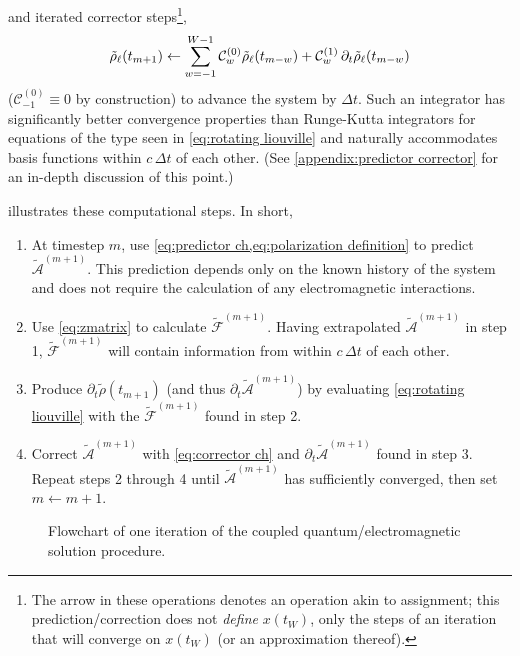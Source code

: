 and iterated corrector steps\footnote{The arrow in these operations denotes an operation akin to assignment; this prediction/correction does not \emph{define} $x(t_W)$, only the steps of an iteration that will converge on $x(t_W)$ (or an approximation thereof).},
\begin{equation}
    \tilde{\rho}_\ell(t_{m + 1}) \leftarrow \sum_{w = -1}^{W - 1} \mathcal{C}_w^{\qty(0)} \tilde{\rho}_\ell(t_{m-w}) + \mathcal{C}_w^{\qty(1)} \, \partial_t \tilde{\rho}_\ell(t_{m-w})
  \label{eq:corrector ch}
\end{equation}
($\mathcal{C}_{-1}^{(0)} \equiv 0$ by construction) to advance the system by $\Delta t$.
Such an integrator has significantly better convergence properties than Runge-Kutta integrators for equations of the type seen in \cref{eq:rotating liouville} and naturally accommodates basis functions within $c \, \Delta t$ of each other.
(See \cref{appendix:predictor corrector} for an in-depth discussion of this point.)

 illustrates these computational steps.
In short,
\begin{enumerate}
  \item At timestep $m$, use \cref{eq:predictor ch,eq:polarization definition} to predict $\tilde{\mathcal{A}}^{(m + 1)}$.
    This prediction depends only on the known history of the system and does not require the calculation of any electromagnetic interactions.
  \item Use \cref{eq:zmatrix} to calculate $\tilde{\mathcal{F}}^{(m + 1)}$.
    Having extrapolated $\tilde{\mathcal{A}}^{(m + 1)}$ in step 1, $\tilde{\mathcal{F}}^{(m + 1)}$ will contain information from \qds{} within $c \, \Delta t$ of each other.
  \item Produce $\partial_t \tilde{\rho}(t_{m + 1})$ (and thus $\partial_t \tilde{\mathcal{A}}^{(m + 1)}$) by evaluating \cref{eq:rotating liouville} with the $\tilde{\mathcal{F}}^{(m+1)}$ found in step 2.
  \item Correct $\tilde{\mathcal{A}}^{(m + 1)}$ with \cref{eq:corrector ch} and $\partial_t \tilde{\mathcal{A}}^{(m + 1)}$ found in step 3.
    Repeat steps 2 through 4 until $\tilde{\mathcal{A}}^{(m + 1)}$ has sufficiently converged, then set $m \leftarrow m + 1$.
\end{enumerate}

\begin{figure}
  \centering
  \caption{\label{fig:flowchart} Flowchart of one iteration of the coupled quantum/electromagnetic solution procedure.}
\end{figure}

